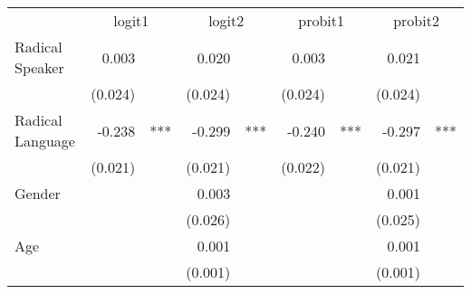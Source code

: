 \documentclass{article}
\begin{document}
\begin{table}[!h]
\centering
\begin{tabular}{lllllllll}
\cline{1-9}
\multicolumn{1}{r}{} &
  \multicolumn{2}{c}{logit1} &
  \multicolumn{2}{c}{logit2} &
  \multicolumn{2}{c}{probit1} &
  \multicolumn{2}{c}{probit2} \\
\cline{1-9}
\multicolumn{1}{l}{Radical Speaker} &
  \multicolumn{1}{r}{0.003} &
  \multicolumn{1}{l}{} &
  \multicolumn{1}{r}{0.020} &
  \multicolumn{1}{l}{} &
  \multicolumn{1}{r}{0.003} &
  \multicolumn{1}{l}{} &
  \multicolumn{1}{r}{0.021} &
  \multicolumn{1}{l}{} \\
\multicolumn{1}{l}{} &
  \multicolumn{1}{r}{(0.024)} &
  \multicolumn{1}{l}{} &
  \multicolumn{1}{r}{(0.024)} &
  \multicolumn{1}{l}{} &
  \multicolumn{1}{r}{(0.024)} &
  \multicolumn{1}{l}{} &
  \multicolumn{1}{r}{(0.024)} &
  \multicolumn{1}{l}{} \\
\multicolumn{1}{l}{Radical Language} &
  \multicolumn{1}{r}{-0.238} &
  \multicolumn{1}{l}{***} &
  \multicolumn{1}{r}{-0.299} &
  \multicolumn{1}{l}{***} &
  \multicolumn{1}{r}{-0.240} &
  \multicolumn{1}{l}{***} &
  \multicolumn{1}{r}{-0.297} &
  \multicolumn{1}{l}{***} \\
\multicolumn{1}{l}{} &
  \multicolumn{1}{r}{(0.021)} &
  \multicolumn{1}{l}{} &
  \multicolumn{1}{r}{(0.021)} &
  \multicolumn{1}{l}{} &
  \multicolumn{1}{r}{(0.022)} &
  \multicolumn{1}{l}{} &
  \multicolumn{1}{r}{(0.021)} &
  \multicolumn{1}{l}{} \\
\multicolumn{1}{l}{Gender} &
  \multicolumn{1}{r}{} &
  \multicolumn{1}{l}{} &
  \multicolumn{1}{r}{0.003} &
  \multicolumn{1}{l}{} &
  \multicolumn{1}{r}{} &
  \multicolumn{1}{l}{} &
  \multicolumn{1}{r}{0.001} &
  \multicolumn{1}{l}{} \\
\multicolumn{1}{l}{} &
  \multicolumn{1}{r}{} &
  \multicolumn{1}{l}{} &
  \multicolumn{1}{r}{(0.026)} &
  \multicolumn{1}{l}{} &
  \multicolumn{1}{r}{} &
  \multicolumn{1}{l}{} &
  \multicolumn{1}{r}{(0.025)} &
  \multicolumn{1}{l}{} \\
\multicolumn{1}{l}{Age} &
  \multicolumn{1}{r}{} &
  \multicolumn{1}{l}{} &
  \multicolumn{1}{r}{0.001} &
  \multicolumn{1}{l}{} &
  \multicolumn{1}{r}{} &
  \multicolumn{1}{l}{} &
  \multicolumn{1}{r}{0.001} &
  \multicolumn{1}{l}{} \\
\multicolumn{1}{l}{} &
  \multicolumn{1}{r}{} &
  \multicolumn{1}{l}{} &
  \multicolumn{1}{r}{(0.001)} &
  \multicolumn{1}{l}{} &
  \multicolumn{1}{r}{} &
  \multicolumn{1}{l}{} &
  \multicolumn{1}{r}{(0.001)} &
  \multicolumn{1}{l}{} \\

\end{tabular}
\end{table}
\end{document}
